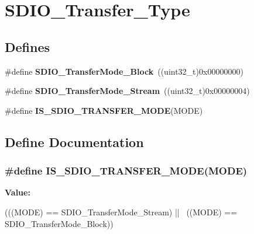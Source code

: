 \hypertarget{group__SDIO__Transfer__Type}{
\section{SDIO\_\-Transfer\_\-Type}
\label{group__SDIO__Transfer__Type}
}
\subsection*{Defines}
\begin{DoxyCompactItemize}
\item 
\hypertarget{group__SDIO__Transfer__Type_ga5b54ada18cc4072ceff1d98ee4b69972}{
\#define {\bfseries SDIO\_\-TransferMode\_\-Block}~((uint32\_\-t)0x00000000)}
\label{group__SDIO__Transfer__Type_ga5b54ada18cc4072ceff1d98ee4b69972}

\item 
\hypertarget{group__SDIO__Transfer__Type_gadd0cafe0a80e6b6cc5c22d838cbb2e28}{
\#define {\bfseries SDIO\_\-TransferMode\_\-Stream}~((uint32\_\-t)0x00000004)}
\label{group__SDIO__Transfer__Type_gadd0cafe0a80e6b6cc5c22d838cbb2e28}

\item 
\#define {\bfseries IS\_\-SDIO\_\-TRANSFER\_\-MODE}(MODE)
\end{DoxyCompactItemize}


\subsection{Define Documentation}
\hypertarget{group__SDIO__Transfer__Type_gaf7565ea93f9ed01558bdc9ad80dac763}{
\subsubsection[{IS\_\-SDIO\_\-TRANSFER\_\-MODE}]{\setlength{\rightskip}{0pt plus 5cm}\#define IS\_\-SDIO\_\-TRANSFER\_\-MODE(MODE)}}
\label{group__SDIO__Transfer__Type_gaf7565ea93f9ed01558bdc9ad80dac763}
{\bfseries Value:}
\begin{DoxyCode}
(((MODE) == SDIO_TransferMode_Stream) || \
                                     ((MODE) == SDIO_TransferMode_Block))
\end{DoxyCode}
